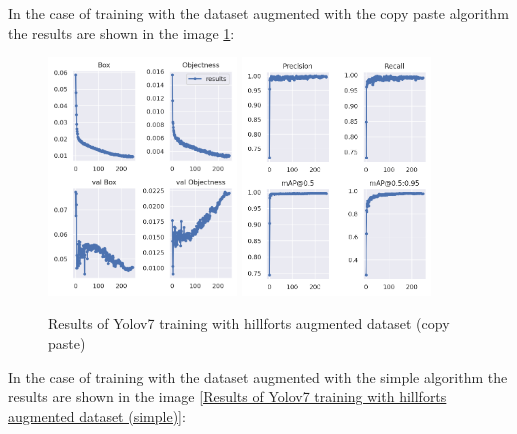 In the case of training with the dataset augmented with the copy paste algorithm the results are shown in the image \ref{Results of Yolov7 training with hillforts augmented dataset (copy paste)}:

\begin{figure}[H]
    \centering
    {{\includegraphics[width=5cm]{images/training/castros/aug1.png} }}
    \qquad
  {{\includegraphics[width=5cm]{images/training/castros/aug2.png} }}
    \caption{Results of Yolov7 training with hillforts augmented dataset (copy paste)}
    \label{Results of Yolov7 training with hillforts augmented dataset (copy paste)}
\end{figure}

In the case of training with the dataset augmented with the simple algorithm the results are shown in the image \ref{Results of Yolov7 training with hillforts augmented dataset (simple)}:

